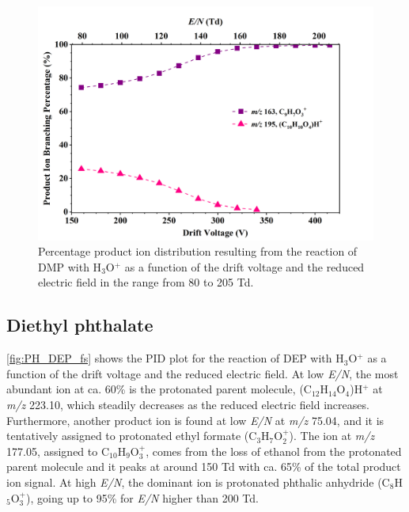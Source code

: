 \begin{figure}[htbp]
\centering
\includegraphics[height=0.4\textheight]{pics/DMP-BR.png}
\caption{Percentage product ion distribution resulting from the reaction of DMP with H$_3$O$^+$ as a function of the drift voltage and the reduced electric field in the range from 80 to 205 Td.}
\label{fig:PH_DMP_fs}
\end{figure}



\subsection{Diethyl phthalate}


\autoref{fig:PH_DEP_fs} shows the PID plot for the reaction of DEP with H$_3$O$^+$ as a function of the drift voltage and the reduced electric field.
At low \textit{E/N}, the most abundant ion at ca. 60\% is the protonated parent molecule, (C$_{12}$H$_{14}$O$_4$)H$^+$  at \textit{m/z} 223.10, which steadily decreases as the reduced electric field increases.
Furthermore, another product ion is found at low \textit{E/N} at \textit{m/z} 75.04, and it is tentatively assigned to protonated ethyl formate (C$_3$H$_{7}$O$_2^+$).
The ion at \textit{m/z} 177.05, assigned to C$_{10}$H$_{9}$O$_3^+$, comes from the loss of ethanol from the protonated parent molecule and it peaks at around 150 Td with ca. 65\% of the total product ion signal.
At high \textit{E/N}, the dominant ion is protonated phthalic anhydride (C$_8$H$_{5}$O$_3^+$), going up to 95\% for \textit{E/N} higher than 200 Td.


